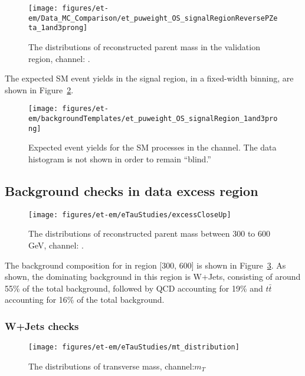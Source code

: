 \begin{figure}\centering
  \texttt{[image: figures/et-em/Data\_MC\_Comparison/et\_puweight\_OS\_signalRegionReversePZeta\_1and3prong]}
  \caption{\label{fig:et_meff_flipped_pz} The distributions of
    reconstructed parent mass in the validation region, \teth channel:
    \meffetau.}
\end{figure}

The expected SM event yields in the signal region, in a fixed-width
binning, are shown in Figure~\ref{fig:etau_sm_template}.
\begin{figure}\centering
  \texttt{[image: figures/et-em/backgroundTemplates/et\_puweight\_OS\_signalRegion\_1and3prong]}
  \caption{\label{fig:etau_sm_template} Expected event yields for the
    SM processes in the \teth channel.  The data histogram is not
    shown in order to remain ``blind.''}
\end{figure}



\subsection{Background checks in data excess region}
\label{sec:bkg_validation_in_data_excess_region}

\begin{figure}\centering
  \texttt{[image: figures/et-em/eTauStudies/excessCloseUp]}
  \caption{\label{fig:closeUp} The distributions of
    reconstructed parent mass between 300 to 600 GeV, \teth channel:
    \meffetau.}
\end{figure}

The background composition for \meffetau in region 
[300, 600] is shown in Figure~\ref{fig:closeUp}. As shown, the dominating 
background in this region is W+Jets, consisting of around 55\% of the total 
background, followed by QCD accounting for 19\% and $t\bar{t}$ accounting for 16\%
of the total background.

\subsubsection{W+Jets checks}
\begin{figure}\centering
  \texttt{[image: figures/et-em/eTauStudies/mt\_distribution]}
  \caption{\label{fig:mT} The distributions of
    transverse mass, \teth channel:$m_T$}
\end{figure}

